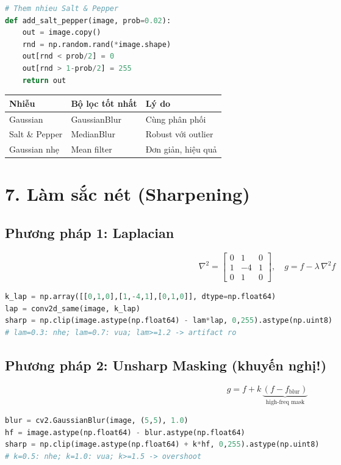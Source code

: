 \documentclass[9pt,landscape,a4paper]{extarticle}
\begin{document}
\begin{multicols*}{3}
\begin{multicols*}{3}
\begin{multicols}{3}
\begin{lstlisting}[language=Python]
# Them nhieu Salt & Pepper
def add_salt_pepper(image, prob=0.02):
    out = image.copy()
    rnd = np.random.rand(*image.shape)
    out[rnd < prob/2] = 0
    out[rnd > 1-prob/2] = 255
    return out
\end{lstlisting}

\begin{center}\small
\begin{tabular}{@{}lll@{}}
\toprule
Nhiễu & Bộ lọc tốt nhất & Lý do \\
\midrule
Gaussian & GaussianBlur & Cùng phân phối \\
Salt \& Pepper & MedianBlur & Robust với outlier \\
Gaussian nhẹ & Mean filter & Đơn giản, hiệu quả \\
\bottomrule
\end{tabular}
\end{center}

\section{7. Làm sắc nét (Sharpening)}

\subsection{Phương pháp 1: Laplacian}
\[
  \nabla^2 = \begin{bmatrix}0&1&0\\1&-4&1\\0&1&0\end{bmatrix}, \quad
  g = f - \lambda\,\nabla^2 f
\]
\begin{lstlisting}[language=Python]
k_lap = np.array([[0,1,0],[1,-4,1],[0,1,0]], dtype=np.float64)
lap = conv2d_same(image, k_lap)
sharp = np.clip(image.astype(np.float64) - lam*lap, 0,255).astype(np.uint8)
# lam=0.3: nhe; lam=0.7: vua; lam>=1.2 -> artifact ro
\end{lstlisting}

\subsection{Phương pháp 2: Unsharp Masking (khuyến nghị!)}
\[
  g = f + k\,\underbrace{(f - f_\text{blur})}_{\text{high-freq mask}}
\]
\begin{lstlisting}[language=Python]
blur = cv2.GaussianBlur(image, (5,5), 1.0)
hf = image.astype(np.float64) - blur.astype(np.float64)
sharp = np.clip(image.astype(np.float64) + k*hf, 0,255).astype(np.uint8)
# k=0.5: nhe; k=1.0: vua; k>=1.5 -> overshoot
\end{lstlisting}


\end{multicols}
\end{multicols*}
\end{multicols*}
\end{document}
